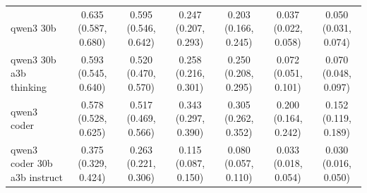 \begin{table}[h!]
{\begin{tabular}{lcccccc}
qwen3 30b & \cellcolor{green!65}0.635 (0.587, 0.680) & \cellcolor{green!65}0.595 (0.546, 0.642) & \cellcolor{green!45}0.247 (0.207, 0.293) & \cellcolor{green!45}0.203 (0.166, 0.245) & \cellcolor{green!14}0.037 (0.022, 0.058) & \cellcolor{green!40}0.050 (0.031, 0.074) \\
qwen3 30b a3b thinking & \cellcolor{green!55}0.593 (0.545, 0.640) & \cellcolor{green!60}0.520 (0.470, 0.570) & \cellcolor{green!50}0.258 (0.216, 0.301) & \cellcolor{green!60}0.250 (0.208, 0.295) & \cellcolor{green!45}0.072 (0.051, 0.101) & \cellcolor{green!50}0.070 (0.048, 0.097) \\
qwen3 coder & \cellcolor{green!50}0.578 (0.528, 0.625) & \cellcolor{green!55}0.517 (0.469, 0.566) & \cellcolor{green!60}0.343 (0.297, 0.390) & \cellcolor{green!65}0.305 (0.262, 0.352) & \cellcolor{green!70}0.200 (0.164, 0.242) & \cellcolor{green!65}0.152 (0.119, 0.189) \\
qwen3 coder 30b a3b instruct & \cellcolor{green!20}0.375 (0.329, 0.424) & \cellcolor{green!14}0.263 (0.221, 0.306) & \cellcolor{green!10}0.115 (0.087, 0.150) & \cellcolor{green!14}0.080 (0.057, 0.110) & \cellcolor{green!10}0.033 (0.018, 0.054) & \cellcolor{green!25}0.030 (0.016, 0.050) \\
\bottomrule
\end{tabular}
}
\end{table}